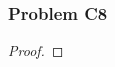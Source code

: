 \documentclass[../../../main.tex]{subfiles}
\begin{document}
\subsubsection{Problem C8}
\begin{wts}

\end{wts}
\begin{proof}

\end{proof}
\end{document}
